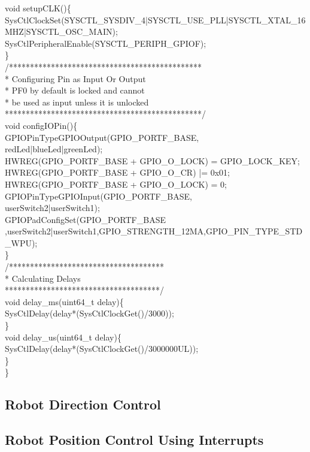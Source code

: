 \documentclass[a4paper,10pt,oneside]{article}
\begin{document}
{		void setupCLK()\{\\
			SysCtlClockSet(SYSCTL\_SYSDIV\_4|SYSCTL\_USE\_PLL|SYSCTL\_XTAL\_16MHZ|SYSCTL\_OSC\_MAIN);\\
			SysCtlPeripheralEnable(SYSCTL\_PERIPH\_GPIOF);\\
		\}\\
		/**********************************************\\
		* Configuring Pin as Input Or Output\\
		* PF0 by default is locked and cannot\\
		* be used as input unless it is unlocked\\
		***********************************************/\\
		void configIOPin()\{\\
			GPIOPinTypeGPIOOutput(GPIO\_PORTF\_BASE,\\ redLed|blueLed|greenLed);\\
			HWREG(GPIO\_PORTF\_BASE + GPIO\_O\_LOCK) = GPIO\_LOCK\_KEY;\\
			HWREG(GPIO\_PORTF\_BASE + GPIO\_O\_CR) |= 0x01;\\
			HWREG(GPIO\_PORTF\_BASE + GPIO\_O\_LOCK) = 0;\\
			GPIOPinTypeGPIOInput(GPIO\_PORTF\_BASE,\\ userSwitch2|userSwitch1);\\
			GPIOPadConfigSet(GPIO\_PORTF\_BASE\\ ,userSwitch2|userSwitch1,GPIO\_STRENGTH\_12MA,GPIO\_PIN\_TYPE\_STD\_WPU);\\
		\}\\
		/*************************************\\
		* Calculating Delays\\
		*************************************/\\
		void delay\_ms(uint64\_t delay)\{\\
			SysCtlDelay(delay*(SysCtlClockGet()/3000));\\
		\}\\
		void delay\_us(uint64\_t delay)\{\\
			SysCtlDelay(delay*(SysCtlClockGet()/3000000UL));\\
		\}\\
	\}\\
		\subsection{\huge \textbf{Robot Direction Control}}
		\subsection{\huge \textbf{Robot Position Control Using Interrupts}}
}
\end{document}
